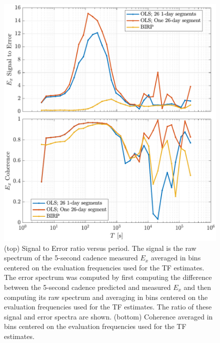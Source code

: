 \documentclass{article}
\begin{document}
\begin{figure}[h!]
\centering
\includegraphics[width=\textwidth]{figures/KAP103/SN_compare-E_x.pdf}
\caption{(top) Signal to Error ratio versus period. The signal is the raw spectrum of the 5-second cadence measured $E_x$ averaged in bins centered on the evaluation frequencies used for the TF estimates. The error spectrum was computed by first computing the difference between the 5-second cadence predicted and measured $E_x$ and then computing its raw spectrum and averaging in bins centered on the evaluation frequencies used for the TF estimates. The ratio of these signal and error spectra are shown. (bottom) Coherence averaged in bins centered on the evaluation frequencies used for the TF estimates.}
\label{fig:universe}
\end{figure}
\end{document}
